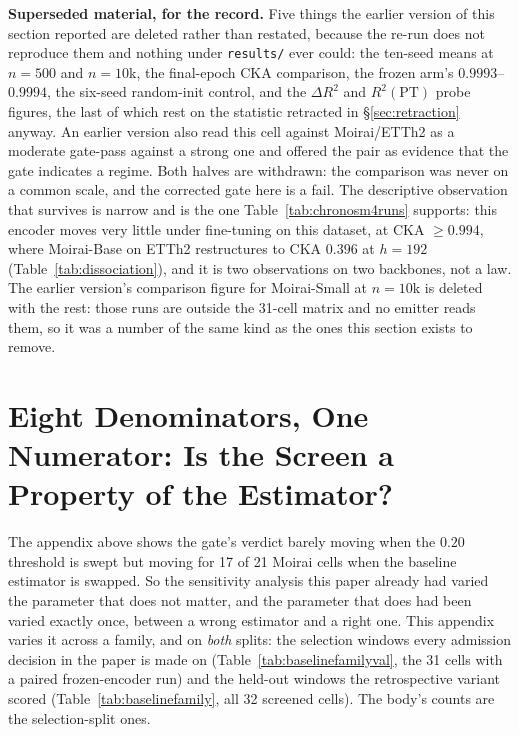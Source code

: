 \textbf{Superseded material, for the record.}
Five things the earlier version of this section reported are deleted rather than
restated, because the re-run does not reproduce them and nothing under
\texttt{results/} ever could: the ten-seed means at $n{=}500$ and $n{=}10$k, the
final-epoch CKA comparison, the frozen arm's $0.9993$--$0.9994$, the six-seed
random-init control, and the $\Delta R^2$ and $R^2(\text{PT})$ probe figures,
the last of which rest on the statistic retracted in \S\ref{sec:retraction}
anyway.  An earlier version also read this cell against Moirai/ETTh2 as a
moderate gate-pass against a strong one and offered the pair as evidence that the
gate indicates a regime.  Both halves are withdrawn: the comparison was never on a
common scale, and the corrected gate here is a fail.  The descriptive observation
that survives is narrow and is the one Table~\ref{tab:chronosm4runs} supports:
this encoder moves very little under fine-tuning on this dataset, at CKA
${\geq}0.994$, where Moirai-Base on ETTh2 restructures to CKA $0.396$ at
$h{=}192$ (Table~\ref{tab:dissociation}), and it is two observations on two
backbones, not a law.  The earlier version's comparison figure
for Moirai-Small at $n{=}10$k is deleted with the rest: those runs are outside the
31-cell matrix and no emitter reads them, so it was a number of the same kind as
the ones this section exists to remove.

\section{Eight Denominators, One Numerator: Is the Screen a Property of the Estimator?}
\label{app:baselines}

The appendix above shows the gate's verdict barely moving when the $0.20$
threshold is swept but moving for 17 of 21 Moirai cells when the baseline
estimator is swapped.  So the sensitivity analysis this paper already had varied
the parameter that does not matter, and the parameter that does had been varied
exactly once, between a wrong estimator and a right one.  This appendix varies
it across a family, and on \emph{both} splits: the selection windows every
admission decision in the paper is made on (Table~\ref{tab:baselinefamilyval}, the
31 cells with a paired frozen-encoder run) and the held-out windows the
retrospective variant scored (Table~\ref{tab:baselinefamily}, all 32 screened
cells).  The body's counts are the selection-split ones.

